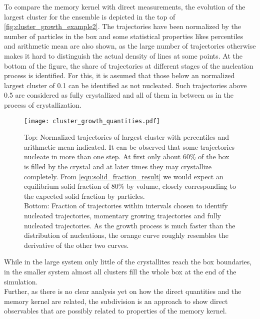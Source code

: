 To compare the memory kernel with direct measurements, the evolution of the largest cluster for the ensemble is depicted in the top of \autoref{fig:cluster_growth_example2}. The trajectories have been normalized by the number of particles in the box and some statistical properties likes percentiles and arithmetic mean are also shown, as the large number of trajectories otherwise makes it hard to distinguish the actual density of lines at some points. At the bottom of the figure, the share of trajectories at different stages of the nucleation process is identified. For this, it is assumed that those below an normalized largest cluster of 0.1 can be identified as not nucleated. Such trajectories above 0.5 are considered as fully crystallized and all of them in between as in the process of crystallization.\\
\begin{figure}[h]
\centering
\texttt{[image: cluster\_growth\_quantities.pdf]}
\caption[Largest cluster trajectories of small system with percentiles and average]{Top: Normalized trajectories of largest cluster with percentiles and arithmetic mean indicated. It can be observed that some trajectories nucleate in more than one step. At first only about 60\% of the box is filled by the crystal and at later times they may crystallize completely. From \autoref{eqn:solid_fraction_result} we would expect an equilibrium solid fraction of 80\% by volume, closely corresponding to the expected solid fraction by particles.\\
Bottom: Fraction of trajectories within intervals chosen to identify nucleated trajectories, momentary growing trajectories and fully nucleated trajectories. As the growth process is much faster than the distribution of nucleations, the orange curve roughly resembles the derivative of the other two curves.}
\label{fig:cluster_growth_example2}
\end{figure}

While in the large system only little of the crystallites reach the box boundaries, in the smaller system almost all clusters fill the whole box at the end of the simulation.\\
Further, as there is no clear analysis yet on how the direct quantities and the memory kernel are related, the subdivision is an approach to show direct observables that are possibly related to properties of the memory kernel.\\

